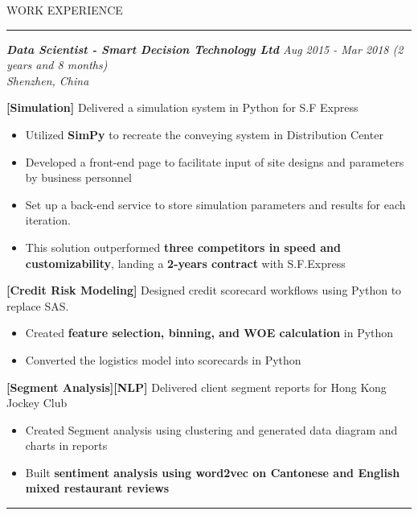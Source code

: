 \documentclass{resume} %
\begin{document}
\begin{rSection}{WORK EXPERIENCE}
\rule{\textwidth}{1pt}



\sl\textbf{Data Scientist - Smart Decision Technology Ltd} \hfill {Aug 2015 - Mar 2018 (2 years and 8 months)}\\
Shenzhen, China\

\item [\textbullet] \textbf{[Simulation]} Delivered a simulation system in Python for S.F Express
\begin{itemize}
    \item Utilized \textbf{SimPy} to recreate the conveying system in Distribution Center
    \item Developed a front-end page to facilitate input of site designs and parameters by business personnel
    \item Set up a back-end service to store simulation parameters and results for each iteration.
    \item This solution outperformed \textbf{three competitors in speed and customizability}, landing a \textbf{2-years contract} with S.F.Express
\end{itemize}

\item [\textbullet] \textbf{[Credit Risk Modeling]} Designed credit scorecard workflows using Python to replace SAS. 
\begin{itemize}
    \item Created \textbf{feature selection, binning, and WOE calculation} in Python
    \item Converted the logistics model into scorecards in Python
\end{itemize}

\item [\textbullet] \textbf{[Segment Analysis][NLP]} Delivered client segment reports for Hong Kong Jockey Club
\begin{itemize}
    \item Created Segment analysis using clustering and generated data diagram and charts in reports
    \item Built \textbf{sentiment analysis using word2vec on Cantonese and English mixed restaurant reviews}
\end{itemize}

\rule{\textwidth}{1pt}




\end{rSection}
\end{document}
